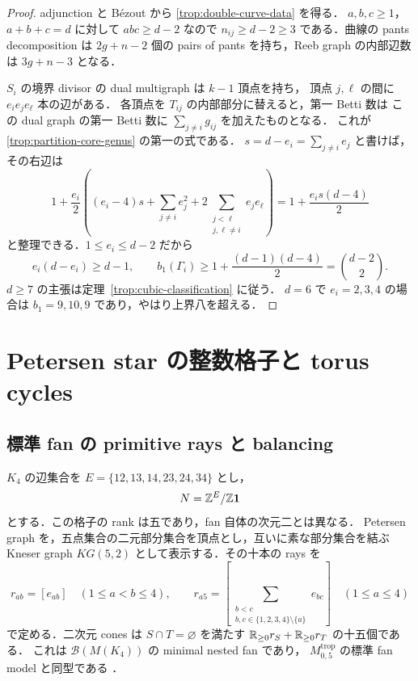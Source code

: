 \begin{proof}
adjunction と B\'ezout から \eqref{trop:double-curve-data} を得る．
$a,b,c\geq1$，$a+b+c=d$ に対して $abc\geq d-2$ なので
$n_{ij}\geq d-2\geq3$ である．曲線の pants decomposition は
$2g+n-2$ 個の pairs of pants を持ち，Reeb graph の内部辺数は
$3g+n-3$ となる．

$S_i$ の境界 divisor の dual multigraph は $k-1$ 頂点を持ち，
頂点 $j,\ell$ の間に $e_i e_j e_\ell$ 本の辺がある．
各頂点を $T_{ij}$ の内部部分に替えると，第一 Betti 数は
この dual graph の第一 Betti 数に $\sum_{j\ne i}g_{ij}$ を加えたものとなる．
これが \eqref{trop:partition-core-genus} の第一の式である．
$s=d-e_i=\sum_{j\ne i}e_j$ と書けば，その右辺は
\[
 1+\frac{e_i}{2}
 \left((e_i-4)s+\sum_{j\ne i}e_j^2+
                   2\sum_{\substack{j<\ell\\j,\ell\ne i}}e_j e_\ell\right)
 =1+\frac{e_i s(d-4)}2
\]
と整理できる．$1\leq e_i\leq d-2$ だから
\[
 e_i(d-e_i)\geq d-1,
 \qquad b_1(\Gamma_i)\geq1+\frac{(d-1)(d-4)}2=\binom{d-2}{2}.
\]
$d\geq7$ の主張は定理~\ref{trop:cubic-classification} に従う．
$d=6$ で $e_i=2,3,4$ の場合は $b_1=9,10,9$ であり，やはり上界八を超える．
\end{proof}



\section{Petersen star の整数格子と torus cycles}
\label{trop:petersen-lattice-section}

\subsection{標準 fan の primitive rays と balancing}

$K_4$ の辺集合を
$E=\{12,13,14,23,24,34\}$ とし，
\[
 N=\mathbb Z^E/\mathbb Z\mathbf 1
\]
とする．この格子の rank は五であり，fan 自体の次元二とは異なる．
Petersen graph を，五点集合の二元部分集合を頂点とし，互いに素な部分集合を結ぶ
Kneser graph $KG(5,2)$ として表示する．その十本の rays を
\begin{equation}\label{trop:ray-formula}
 r_{ab}=[e_{ab}]\quad(1\leq a<b\leq4),\qquad
 r_{a5}=\left[\sum_{\substack{b<c\\b,c\in\{1,2,3,4\}\setminus\{a\}}}e_{bc}\right]
 \quad(1\leq a\leq4)
\end{equation}
で定める．二次元 cones は $S\cap T=\varnothing$ を満たす
$\mathbb R_{\geq0}r_S+\mathbb R_{\geq0}r_T$ の十五個である．
これは $\mathcal B(M(K_4))$ の minimal nested fan であり，
$M_{0,5}^{\mathrm{trop}}$ の標準 fan model と同型である
\cite[\S4]{ArdilaKlivans}\cite[arXiv版, Example 2.28]{Shaw}．


